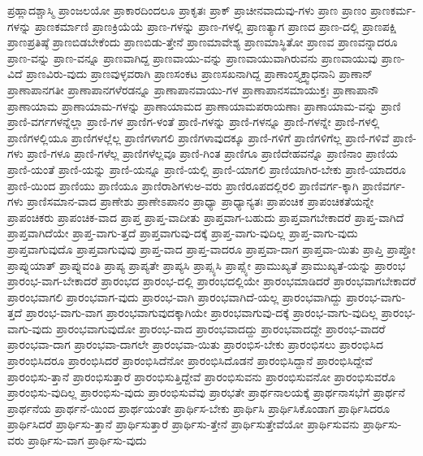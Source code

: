 {ಪ್ರಹ್ಲಾದಶ್ಚಾಸ್ಮಿ
ಪ್ರಾಂಜಲಯೋ
ಪ್ರಾಕಾರದಿಂದಲೂ
ಪ್ರಾಕೃತಃ
ಪ್ರಾಕ್
ಪ್ರಾಚೀನವಾದುವು-ಗಳು
ಪ್ರಾಣ
ಪ್ರಾಣಂ
ಪ್ರಾಣಕರ್ಮ-ಗಳನ್ನು
ಪ್ರಾಣಕರ್ಮಾಣಿ
ಪ್ರಾಣಕ್ರಿಯೆಯೆ
ಪ್ರಾಣ-ಗಳನ್ನು
ಪ್ರಾಣ-ಗಳಲ್ಲಿ
ಪ್ರಾಣತ್ಯಾಗ
ಪ್ರಾಣದ
ಪ್ರಾಣ-ದಲ್ಲಿ
ಪ್ರಾಣಪಕ್ಷಿ
ಪ್ರಾಣಪ್ರತಿಷ್ಠೆ
ಪ್ರಾಣಬಿಡಬೇಕೆಂದು
ಪ್ರಾಣಬಿಡು-ತ್ತೇನೆ
ಪ್ರಾಣಮಾವೇಶ್ಯ
ಪ್ರಾಣಮಾಸ್ಥಿತೋ
ಪ್ರಾಣವ
ಪ್ರಾಣವನ್ನಾದರೂ
ಪ್ರಾಣ-ವನ್ನು
ಪ್ರಾಣ-ವನ್ನೂ
ಪ್ರಾಣವಾಗಿದ್ದ
ಪ್ರಾಣವಾಯು-ವನ್ನು
ಪ್ರಾಣವಾಯುವಾಗಿರುವನು
ಪ್ರಾಣವಾಯುವು
ಪ್ರಾಣ-ವಿದೆ
ಪ್ರಾಣವಿರು-ವುದು
ಪ್ರಾಣವುಳ್ಳವರಾಗಿ
ಪ್ರಾಣಸಂಕಟ
ಪ್ರಾಣಸಖನಾಗಿದ್ದ
ಪ್ರಾಣಾಂಸ್ತ್ಯಕ್ತ್ವಾಧನಾನಿ
ಪ್ರಾಣಾನ್
ಪ್ರಾಣಾಪಾನಗತೀ
ಪ್ರಾಣಾಪಾನಗಳೆರಡನ್ನೂ
ಪ್ರಾಣಾಪಾನವಾಯು-ಗಳ
ಪ್ರಾಣಾಪಾನಸಮಾಯುಕ್ತಃ
ಪ್ರಾಣಾಪಾನೌ
ಪ್ರಾಣಾಯಾಮ
ಪ್ರಾಣಾಯಾಮ-ಗಳನ್ನು
ಪ್ರಾಣಾಯಾಮದ
ಪ್ರಾಣಾಯಾಮಪರಾಯಣಾಃ
ಪ್ರಾಣಾಯಾಮ-ವನ್ನು
ಪ್ರಾಣಿ
ಪ್ರಾಣಿ-ವರ್ಗಗಳನ್ನೆಲ್ಲಾ
ಪ್ರಾಣಿ-ಗಳ
ಪ್ರಾಣಿಗ-ಳಂತೆ
ಪ್ರಾಣಿ-ಗಳನ್ನು
ಪ್ರಾಣಿ-ಗಳನ್ನೂ
ಪ್ರಾಣಿ-ಗಳನ್ನೇ
ಪ್ರಾಣಿ-ಗಳಲ್ಲಿ
ಪ್ರಾಣಿಗಳಲ್ಲಿಯೂ
ಪ್ರಾಣಿಗಳಲ್ಲೆಲ್ಲ
ಪ್ರಾಣಿಗಳಾಗಲಿ
ಪ್ರಾಣಿಗಳಾವುದಕ್ಕೂ
ಪ್ರಾಣಿ-ಗಳಿಗೆ
ಪ್ರಾಣಿಗಳಿಗೆಲ್ಲ
ಪ್ರಾಣಿ-ಗಳಿವೆ
ಪ್ರಾಣಿ-ಗಳು
ಪ್ರಾಣಿ-ಗಳೂ
ಪ್ರಾಣಿ-ಗಳೆಲ್ಲ
ಪ್ರಾಣಿಗಳೆಲ್ಲವೂ
ಪ್ರಾಣಿ-ಗಿಂತ
ಪ್ರಾಣಿಗೂ
ಪ್ರಾಣಿದೇಹವನ್ನೊ
ಪ್ರಾಣಿನಾಂ
ಪ್ರಾಣಿಯ
ಪ್ರಾಣಿ-ಯಂತೆ
ಪ್ರಾಣಿ-ಯನ್ನು
ಪ್ರಾಣಿ-ಯನ್ನೂ
ಪ್ರಾಣಿ-ಯಲ್ಲಿ
ಪ್ರಾಣಿ-ಯಾಗಲಿ
ಪ್ರಾಣಿಯಾಗಿರ-ಬೇಕು
ಪ್ರಾಣಿ-ಯಾದರೂ
ಪ್ರಾಣಿ-ಯಿಂದ
ಪ್ರಾಣಿಯು
ಪ್ರಾಣಿಯೂ
ಪ್ರಾಣಿರಾಶಿಗಳುಅ-ವರು
ಪ್ರಾಣಿರೂಪದಲ್ಲಿರಲಿ
ಪ್ರಾಣಿವರ್ಗ-ಕ್ಕಾಗಿ
ಪ್ರಾಣಿವರ್ಗ-ಗಳು
ಪ್ರಾಣಿಸಮಾನ-ವಾದ
ಪ್ರಾಣೇಶು
ಪ್ರಾಣೇಽಪಾನಂ
ಪ್ರಾಧ್ಯಾ
ಪ್ರಾಧ್ಯಾನ್ಯತಃ
ಪ್ರಾಪಂಚಿಕ
ಪ್ರಾಪಂಚಿಕತೆಯನ್ನೇ
ಪ್ರಾಪಂಚಿಕರು
ಪ್ರಾಪಂಚಿಕ-ವಾದ
ಪ್ರಾಪ್ತ
ಪ್ರಾಪ್ತ-ವಾದೀತು
ಪ್ರಾಪ್ತವಾಗ-ಬಹುದು
ಪ್ರಾಪ್ತವಾಗಬೇಕಾದರೆ
ಪ್ರಾಪ್ತ-ವಾಗಿದೆ
ಪ್ರಾಪ್ತವಾಗಿದೆಯೇ
ಪ್ರಾಪ್ತ-ವಾಗು-ತ್ತದೆ
ಪ್ರಾಪ್ತವಾಗುವು-ದಕ್ಕೆ
ಪ್ರಾಪ್ತ-ವಾಗು-ವುದಿಲ್ಲ
ಪ್ರಾಪ್ತ-ವಾಗು-ವುದು
ಪ್ರಾಪ್ತವಾಗುವುದೊ
ಪ್ರಾಪ್ತವಾಗುವುವು
ಪ್ರಾಪ್ತ-ವಾದ
ಪ್ರಾಪ್ತ-ವಾದರೂ
ಪ್ರಾಪ್ತವಾ-ದಾಗ
ಪ್ರಾಪ್ತವಾ-ಯಿತು
ಪ್ರಾಪ್ತಿ
ಪ್ರಾಪ್ತೋ
ಪ್ರಾಪ್ನುಯಾತ್
ಪ್ರಾಪ್ನುವಂತಿ
ಪ್ರಾಪ್ಯ
ಪ್ರಾಪ್ಯತೇ
ಪ್ರಾಪ್ಯಸಿ
ಪ್ರಾಪ್ಸ್ಯಸಿ
ಪ್ರಾಪ್ಸ್ಯೇ
ಪ್ರಾಮುಖ್ಯತೆ
ಪ್ರಾಮುಖ್ಯತೆ-ಯನ್ನು
ಪ್ರಾರಂಭ
ಪ್ರಾರಂಭ-ವಾಗ-ಬೇಕಾದರೆ
ಪ್ರಾರಂಭದ
ಪ್ರಾರಂಭ-ದಲ್ಲಿ
ಪ್ರಾರಂಭದಲ್ಲಿಯೇ
ಪ್ರಾರಂಭಮಾಡಿದರೆ
ಪ್ರಾರಂಭವಾಗಬೇಕಾದರೆ
ಪ್ರಾರಂಭವಾಗಲಿ
ಪ್ರಾರಂಭವಾಗ-ವುದು
ಪ್ರಾರಂಭ-ವಾಗಿ
ಪ್ರಾರಂಭವಾಗಿದೆ-ಯಲ್ಲ
ಪ್ರಾರಂಭವಾಗಿದ್ದು
ಪ್ರಾರಂಭ-ವಾಗು-ತ್ತದೆ
ಪ್ರಾರಂಭ-ವಾಗು-ವಾಗ
ಪ್ರಾರಂಭವಾಗುವುದಕ್ಕಾಗಿಯೇ
ಪ್ರಾರಂಭವಾಗುವು-ದಕ್ಕೆ
ಪ್ರಾರಂಭ-ವಾಗು-ವುದಿಲ್ಲ
ಪ್ರಾರಂಭ-ವಾಗು-ವುದು
ಪ್ರಾರಂಭವಾಗುವುದೋ
ಪ್ರಾರಂಭ-ವಾದ
ಪ್ರಾರಂಭವಾದದ್ದು
ಪ್ರಾರಂಭವಾದದ್ದೇ
ಪ್ರಾರಂಭ-ವಾದರೆ
ಪ್ರಾರಂಭವಾ-ದಾಗ
ಪ್ರಾರಂಭವಾ-ದಾಗಲೇ
ಪ್ರಾರಂಭವಾ-ಯಿತು
ಪ್ರಾರಂಭಿಸ-ಬೇಕು
ಪ್ರಾರಂಭಿಸಲು
ಪ್ರಾರಂಭಿಸಿದ
ಪ್ರಾರಂಭಿಸಿದರೂ
ಪ್ರಾರಂಭಿಸಿದರೆ
ಪ್ರಾರಂಭಿಸಿದೆನೋ
ಪ್ರಾರಂಭಿಸಿದೊಡನೆ
ಪ್ರಾರಂಭಿಸಿದ್ದಾನೆ
ಪ್ರಾರಂಭಿಸಿದ್ದೇವೆ
ಪ್ರಾರಂಭಿಸು-ತ್ತಾನೆ
ಪ್ರಾರಂಭಿಸುತ್ತಾರೆ
ಪ್ರಾರಂಭಿಸುತ್ತಿದ್ದೇವೆ
ಪ್ರಾರಂಭಿಸುವನು
ಪ್ರಾರಂಭಿಸುವನೋ
ಪ್ರಾರಂಭಿಸುವರೊ
ಪ್ರಾರಂಭಿಸು-ವುದಿಲ್ಲ
ಪ್ರಾರಂಭಿಸು-ವುದು
ಪ್ರಾರಂಭಿಸುವೆವು
ಪ್ರಾರಭತೇ
ಪ್ರಾರ್ಥನಾಲಯಕ್ಕೆ
ಪ್ರಾರ್ಥನಾಸಭೆಗೆ
ಪ್ರಾರ್ಥನೆ
ಪ್ರಾರ್ಥನೆಯ
ಪ್ರಾರ್ಥನೆ-ಯಿಂದ
ಪ್ರಾರ್ಥಯಂತೇ
ಪ್ರಾರ್ಥಿಸ-ಬೇಕು
ಪ್ರಾರ್ಥಿಸಿ
ಪ್ರಾರ್ಥಿಸಿಕೊಂಡಾಗ
ಪ್ರಾರ್ಥಿಸಿದರೂ
ಪ್ರಾರ್ಥಿಸಿದರೆ
ಪ್ರಾರ್ಥಿಸು-ತ್ತಾನೆ
ಪ್ರಾರ್ಥಿಸುತ್ತಾರೆ
ಪ್ರಾರ್ಥಿಸು-ತ್ತೇನೆ
ಪ್ರಾರ್ಥಿಸುತ್ತೇವೆಯೋ
ಪ್ರಾರ್ಥಿಸುವನು
ಪ್ರಾರ್ಥಿಸು-ವರು
ಪ್ರಾರ್ಥಿಸು-ವಾಗ
ಪ್ರಾರ್ಥಿಸು-ವುದು
}
